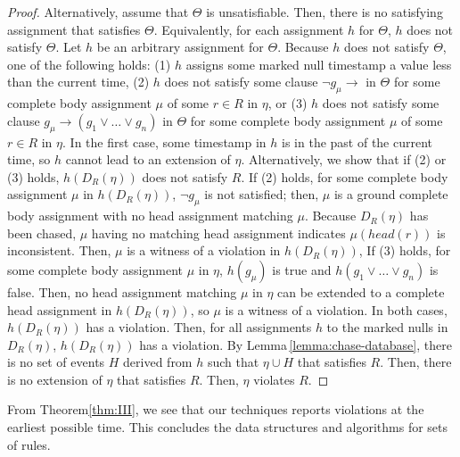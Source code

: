 \begin{proof}
Alternatively,
assume that $\Theta$ is unsatisfiable.
Then,
there is no satisfying assignment that satisfies $\Theta$.
Equivalently,
for each assignment $h$ for $\Theta$, $h$ does not satisfy $\Theta$.
Let $h$ be an arbitrary assignment for $\Theta$.
Because $h$ does not satisfy $\Theta$,
one of the following holds:
(1) $h$ assigns some marked null timestamp a value less than the current time,
(2) $h$ does not satisfy some clause $\neg g_\mu\rightarrow$ in $\Theta$
for some complete body assignment $\mu$ of some $r\in R$ in $\eta$,
or
(3) $h$ does not satisfy some clause $g_\mu\rightarrow (g_1 \lor\dots\lor g_n)$ in $\Theta$
for some complete body assignment $\mu$ of some $r\in R$ in $\eta$.
In the first case,
some timestamp in $h$ is in the past of the current time,
so $h$ cannot lead to an extension of $\eta$.
Alternatively,
we show that if (2) or (3) holds,
$h(D_{R}(\eta))$ does not satisfy $R$.
If (2) holds,
for some complete body assignment $\mu$ in $h(D_{R}(\eta))$,
$\neg g_\mu$ is not satisfied;
then, $\mu$ is a ground complete body assignment
with no head assignment matching $\mu$.
Because $D_{R}(\eta)$ has been chased,
$\mu$ having no matching head assignment
indicates $\mu(head(r))$ is inconsistent.
Then, $\mu$ is a witness of a violation in $h(D_{R}(\eta))$,
If (3) holds,
for some complete body assignment $\mu$ in $\eta$,
$h(g_\mu)$ is true and $h(g_1 \lor\dots\lor g_n)$ is false.
Then,
no head assignment matching $\mu$ in $\eta$
can be extended to a complete head assignment in $h(D_{R}(\eta))$,
so $\mu$ is a witness of a violation.
In both cases,
$h(D_{R}(\eta))$ has a violation.
Then,
for all assignments $h$ to the marked nulls in $D_{R}(\eta)$,
$h(D_{R}(\eta))$ has a  violation.
By Lemma\,\ref{lemma:chase-database},
there is no set of events $H$ derived from $h$
such that $\eta\cup H$ that satisfies $R$.
Then,
there is no extension of $\eta$ that satisfies $R$.
Then, $\eta$ violates $R$.
\end{proof}

From Theorem\:\ref{thm:III},
we see that our techniques
reports violations at the earliest possible time.
This concludes the data structures and algorithms
for sets of rules.


